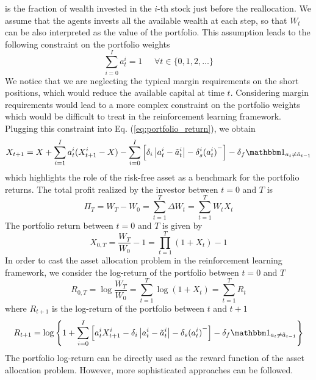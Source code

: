 is the fraction of wealth invested in the $i$-th stock just before the 
reallocation. We assume that the agents invests all the available wealth at each step, so that $W_t$ can be also interpreted as the value of the portfolio. This assumption leads to the following constraint on the portfolio weights
\begin{equation}
	\sum^{I}_{i=0} a_t^i = 1 \;\;\;\;\; \forall t \in \{0, 1, 2, \ldots\}
\end{equation}
We notice that we are neglecting the typical margin requirements on the short
positions, which would reduce the available capital at time $t$. Considering
margin requirements would lead to a more complex constraint on the portfolio
weights which would be difficult to treat in the reinforcement learning
framework. Plugging this constraint into Eq. (\ref{eq:portfolio_return}), we
obtain
\begin{equation}\label{eq:portfolio_return_benchmark}
	X_{t+1} = X + \sum^{I}_{i=1} a_t^i (X_{t+1}^i - X) - \sum^{I}_{i=0}
	\left[\delta_i \left| a_t^i - \tilde{a}_t^i \right| - \delta_s^i
	{(a_t^i)}^-\right] - \delta_f \ind{{a}_t \neq \tilde{{a}}_{t-1}}   
\end{equation}
which highlights the role of the risk-free asset as a benchmark for the 
portfolio returns. The total profit realized by the investor between $t=0$ and
$T$ is 
\begin{equation*}
	\Pi_T = W_T - W_0 = \sum^{T}_{t=1} \Delta W_t = \sum^{T}_{t=1} W_t X_t  
\end{equation*}
The portfolio return between $t=0$ and $T$ is given by
\begin{equation*}
	X_{0,T} = \frac{W_T}{W_0} - 1 = \prod_{t=1}^T (1+X_t) - 1
\end{equation*}
In order to cast the asset allocation problem in the reinforcement learning
framework, we consider the log-return of the portfolio between $t=0$ and $T$
\begin{equation}
	R_{0,T} = \log \frac{W_T}{W_0} = \sum^{T}_{t=1} \log(1+X_t) = \sum_{t=1}^T
	R_t
\end{equation}
where $R_{t+1}$ is the log-return of the portfolio between $t$ and $t+1$
\begin{equation}
	\label{eq:portfolio_daily_logreturn}
	R_{t+1} = \log \left\{ 1 + \sum^{I}_{i=0} \left[ a_t^i X_{t+1}^i - \delta_i
	\left| a_t^i - \tilde{a}_t^i \right| - \delta_s {(a_t^i)}^- \right] -
	\delta_f \ind{{a}_t \neq \tilde{{a}}_{t-1}}\right\}
\end{equation}
The portfolio log-return can be directly used as the reward function of the asset allocation problem. However, more sophisticated approaches can be followed.

